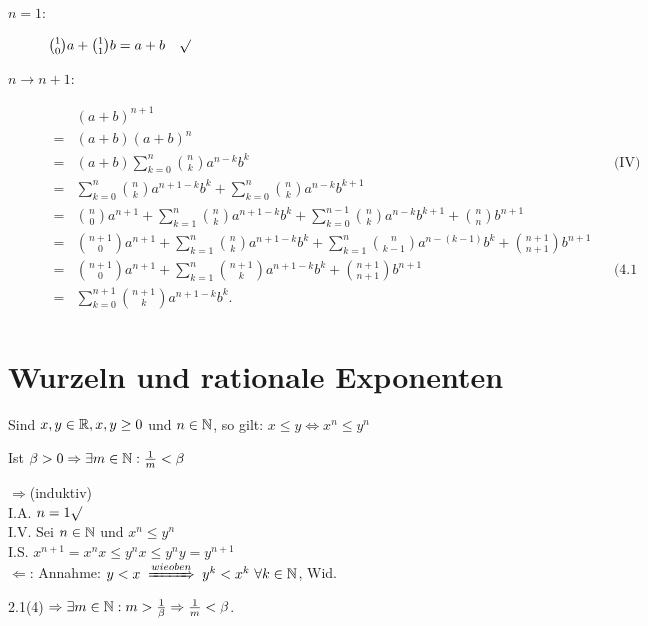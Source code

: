 \documentclass[a4paper,twoside,DIV15,BCOR12mm]{scrbook}
\begin{document}
\begin{beweis}
\begin{description}
\item[$n=1$:] $\binom{1}{0}a+\binom{1}{1}b=a+b\quad\surd$
\item[$n\longrightarrow n+1$:]
\begin{align*}
&(a+b)^{n+1}\\
=&(a+b)(a+b)^n\\
=&(a+b)\sum_{k=0}^n{\binom{n}{k}a^{n-k}b^k} && \text{(IV)}\\
=&\sum_{k=0}^n{\binom{n}{k}a^{n+1-k}b^k}+\sum_{k=0}^n{\binom{n}{k}a^{n-k}b^{k+1}}\\
=&\binom{n}{0}a^{n+1}+\sum_{k=1}^n{\binom{n}{k}a^{n+1-k}b^k}+\sum_{k=0}^{n-1}{\binom{n}{k}a^{n-k}b^{k+1}}+\binom{n}{n}b^{n+1}\\
=&\binom{n+1}{0}a^{n+1}+\sum_{k=1}^n{\binom{n}{k}a^{n+1-k}b^k}+\sum_{k=1}^{n}{\binom{n}{k-1}a^{n-(k-1)}b^{k}}+\binom{n+1}{n+1}b^{n+1}\\
=&\binom{n+1}{0}a^{n+1}+\sum_{k=1}^n{\binom{n+1}{k}a^{n+1-k}b^k}+\binom{n+1}{n+1}b^{n+1} && \text{(4.1 (2))}\\
=&\sum_{k=0}^{n+1}{\binom{n+1}{k}a^{n+1-k}b^k}\text{.}\\
\end{align*}
\end{description}
\end{beweis}

\chapter{Wurzeln und rationale Exponenten}

\begin{wichtigerhilfssatz}
\begin{liste}
\item Sind $x,y\in\mathbb{R}, x,y\ge0$ und $n\in\mathbb{N}$, so gilt: $x\le y\Leftrightarrow x^{n}\le y^{n}$
\item Ist $\beta > 0\Rightarrow \exists m\in\mathbb{N}:\frac{1}{m} < \beta$
\end{liste}
\end{wichtigerhilfssatz}

\begin{beweise}
\item \glqq$\Rightarrow$\grqq (induktiv)\\
I.A. $n = 1 \surd$\\
I.V. Sei $n\in\mathbb{N}$ und $x^{n}\le y^{n}$\\
I.S. $x^{n+1}=x^{n}x\le y^{n}x\le y^{n}y=y^{n+1}$\\
\glqq$\Leftarrow$\grqq: Annahme: $y < x \folgtwegen{wie oben} y^{k} < x^{k} \ \forall k\in\MdN$, Wid.
\item 2.1(4) $\Rightarrow \exists m\in\mathbb{N}:m>\frac{1}{\beta}\Rightarrow\frac{1}{m}<\beta$.
\end{beweise}
\end{document}
